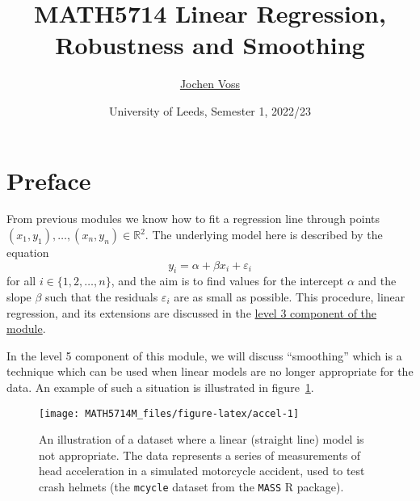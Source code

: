 \documentclass[
  a4paper,
]{article}
\title{MATH5714 Linear Regression, Robustness and Smoothing}
\author{\href{mailto:J.Voss@leeds.ac.uk}{Jochen Voss}}
\date{University of Leeds, Semester 1, 2022/23}
\theoremstyle{definition}
\theoremstyle{definition}
\theoremstyle{definition}
\theoremstyle{definition}
\theoremstyle{remark}
\begin{document}
\maketitle

{
\setcounter{tocdepth}{2}
\tableofcontents
}
\newcommand{\argmin}{\mathop{\mathrm{arg\,min}}\limits}
\newcommand{\bias}{\mathop{\mathrm{bias}}}
\newcommand{\CN}{\mathcal{N}}
\newcommand{\CU}{\mathcal{U}}
\newcommand{\downto}{\downarrow}
\newcommand{\ds}{\displaystyle}
\newcommand{\E}{\mathbb{E}}
\newcommand{\eps}{\varepsilon}
\newcommand{\MSE}{\mathop{\mathrm{MSE}}\nolimits}
\newcommand{\N}{\mathbb{N}}
\renewcommand{\phi}{\varphi}
\newcommand{\R}{\mathbb{R}}
\newcommand{\Var}{\mathop{\mathrm{Var}}}

\hypertarget{home}{%
\section*{Preface}\label{home}}

From previous modules we know how to fit a regression line through
points \((x_1, y_1), \ldots, (x_n, y_n) \in\mathbb{R}^2\). The underlying model
here is described by the equation
\begin{equation*}
  y_i
  = \alpha + \beta x_i + \varepsilon_i
\end{equation*}
for all \(i \in \{1, 2, \ldots, n\}\), and the aim is to find values for
the intercept \(\alpha\) and the slope \(\beta\) such that the residuals
\(\varepsilon_i\) are as small as possible. This procedure,
linear regression, and its extensions are discussed in the \href{https://seehuhn.github.io/MATH3714/}{level 3
component of the module}.

In the level 5 component of this module, we will discuss ``smoothing''
which is a technique which can be used when linear models are no longer
appropriate for the data. An example of such a situation is illustrated
in figure~\ref{fig:accel}.



\begin{figure}

{\centering \texttt{[image: MATH5714M\_files/figure-latex/accel-1]} 

}

\caption{An illustration of a dataset where a linear (straight line) model is not appropriate. The data represents a series of measurements of head acceleration in a simulated motorcycle accident, used to test crash helmets (the \texttt{mcycle} dataset from the \texttt{MASS} R package).}\label{fig:accel}
\end{figure}
\end{document}
